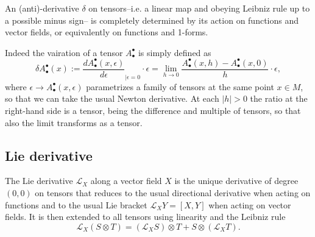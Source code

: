 \begin{mytheorem}
An (anti)-derivative $\delta$ on tensors--i.e. a linear map and obeying Leibniz rule up to a possible minus sign-- is completely determined by its action on functions and vector fields, or equivalently on functions and 1-forms.
\end{mytheorem}



\begin{mytheorem}
Indeed the vairation of a tensor $A^\bullet_\bullet$ is simply defined as 
\begin{equation}
    \delta A^\bullet_\bullet(x):= \frac{d A^\bullet_\bullet(x,\epsilon)}{d\epsilon}_{\mid \epsilon=0} \cdot \epsilon =\lim_{h\to0} \frac{A^\bullet_\bullet(x,h)-A^\bullet_\bullet(x,0)}{h} \cdot \epsilon,
\end{equation}
where $\epsilon\to A^\bullet_\bullet(x,\epsilon)$ parametrizes a family of tensors at the same point $x\in M$, so that we can take the usual Newton derivative.
At each $|h|>0$ the ratio at the right-hand side is a tensor, being the difference and multiple of tensors, so that also the limit transforms as a tensor.
\end{mytheorem}


\subsection{Lie derivative}
\label{sec:lie_derivative}

\begin{mytheorem}
The Lie derivative $\mathcal{L}_X$ along a vector field $X$ is the unique derivative of degree $(0,0)$ on tensors that reduces to the usual directional derivative when acting on functions and to the usual Lie bracket $\mathcal{L}_X Y = [X,Y]$ when acting on vector fields.
It is then extended to all tensors using linearity and the Leibniz rule
\begin{equation}
    \mathcal{L}_X (S \otimes T) = (\mathcal{L}_X S) \otimes T + S \otimes (\mathcal{L}_X T).
\end{equation}
\end{mytheorem}


